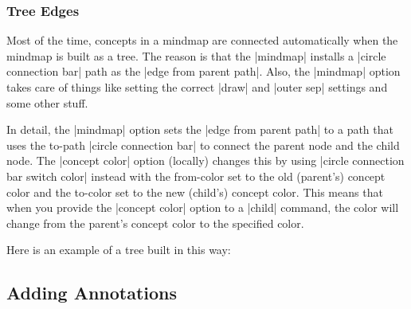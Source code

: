 \subsubsection{Tree Edges}

Most of the time, concepts in a mindmap are connected automatically
when the mindmap is built as a tree. The reason is that the |mindmap|
installs a |circle connection bar| path as the |edge from parent path|. Also, the |mindmap| option takes care of things like setting the
correct |draw| and |outer sep| settings and some other stuff.

In detail, the |mindmap| option sets the |edge from parent path| to a
path that uses the to-path |circle connection bar| to connect the parent node
and the child node. The |concept color| option (locally) changes this
by using |circle connection bar switch color| instead with the
from-color set to the old (parent's) concept color and the to-color
set to the new (child's) concept color. This means that when you
provide the |concept color| option to a |child| command, the color
will change from the parent's concept color to the specified color.

Here is an example of a tree built in this way:

\begin{codeexample}[]
\end{codeexample}



\subsection{Adding Annotations}

